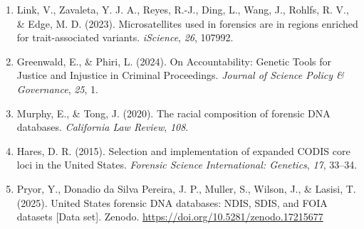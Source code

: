 \documentclass[11pt]{article}
\begin{document}
\begin{enumerate}
\item Link, V., Zavaleta, Y. J. A., Reyes, R.-J., Ding, L., Wang, J., Rohlfs, R. V., \& Edge, M. D. (2023). Microsatellites used in forensics are in regions enriched for trait-associated variants. \textit{iScience}, \textit{26}, 107992.

\item Greenwald, E., \& Phiri, L. (2024). On Accountability: Genetic Tools for Justice and Injustice in Criminal Proceedings. \textit{Journal of Science Policy \& Governance}, \textit{25}, 1.

\item Murphy, E., \& Tong, J. (2020). The racial composition of forensic DNA databases. \textit{California Law Review}, \textit{108}.

\item Hares, D. R. (2015). Selection and implementation of expanded CODIS core loci in the United States. \textit{Forensic Science International: Genetics}, \textit{17}, 33--34.

\item Pryor, Y., Donadio da Silva Pereira, J. P., Muller, S., Wilson, J., \& Lasisi, T. (2025). United States forensic DNA databases: NDIS, SDIS, and FOIA datasets [Data set]. Zenodo. \url{https://doi.org/10.5281/zenodo.17215677}
\end{enumerate}
\end{document}

